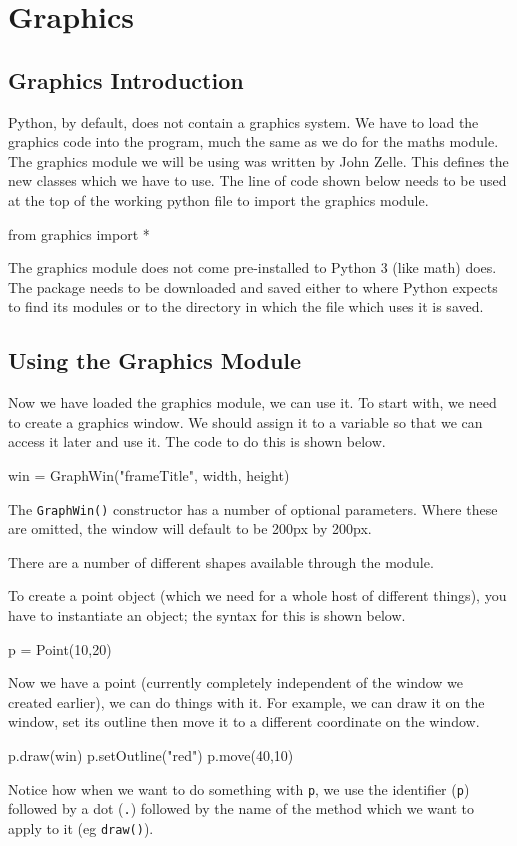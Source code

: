 \section*{Graphics}
\subsection*{Graphics Introduction}
Python, by default, does not contain a graphics system. We have to load the graphics code into the program, much the same as we do for the maths module. The graphics module we will be using was written by John Zelle. This defines the new classes which we have to use. The line of code shown below needs to be used at the top of the working python file to import the graphics module.
\begin{python}
from graphics import *
\end{python}
The graphics module does not come pre-installed to Python 3 (like math) does. The package needs to be downloaded and saved either to where Python expects to find its modules or to the directory in which the file which uses it is saved.

\subsection*{Using the Graphics Module}
Now we have loaded the graphics module, we can use it. To start with, we need to create a graphics window. We should assign it to a variable so that we can access it later and use it. The code to do this is shown below.
\begin{python}
win = GraphWin("frameTitle", width, height)
\end{python}
The \verb|GraphWin()| constructor has a number of optional parameters. Where these are omitted, the window will default to be 200px by 200px.

There are a number of different shapes available through the module. 

To create a point object (which we need for a whole host of different things), you have to instantiate an object; the syntax for this is shown below.
\begin{python}
p = Point(10,20)
\end{python} 
Now we have a point (currently completely independent of the window we created earlier), we can do things with it. For example, we can draw it on the window, set its outline then move it to a different coordinate on the window.
\begin{python}
p.draw(win)
p.setOutline("red")
p.move(40,10)
\end{python}
Notice how when we want to do something with \verb|p|, we use the identifier (\verb|p|) followed by a dot (\verb|.|) followed by the name of the method which we want to apply to it (eg \verb|draw()|). 

